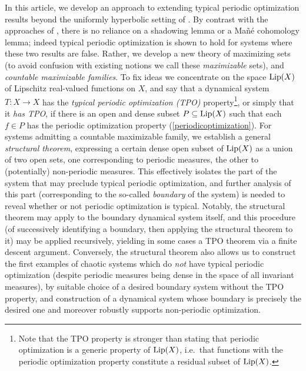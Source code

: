 \documentclass[reqno,11pt]{amsart}
\theoremstyle{definition}
\theoremstyle{remark}
\theoremstyle{remark}
\def\lip{{\rm Lip}}
\numberwithin{equation}{section}
\begin{document}
In this article, we develop an approach to extending typical periodic optimization results beyond the uniformly hyperbolic setting of \cite{C02, HLMXZ19}. By contrast with the approaches of  \cite{C02, HLMXZ19,LZ24},
there is no reliance on a shadowing lemma or a Ma\~n\'e cohomology lemma; indeed typical periodic optimization is shown to hold for systems where these two results are false.
Rather, we develop a new theory of maximizing sets (to avoid confusion with existing notions we call these \emph{maximizable} sets), and \emph{countable maximizable families}.
To fix ideas we concentrate on the space $\lip(X)$ of Lipschitz real-valued functions on $X$,
and say that a dynamical system $T:X\to X$
has the \emph{typical periodic optimization (TPO)} property\footnote{Note that the TPO property is stronger than stating that periodic optimization is a generic property of $\lip(X)$, i.e.~that
functions with the periodic optimization property constitute a residual subset of $\lip(X)$.},
or simply that it \emph{has TPO},
if
there is an open and dense subset $P\subseteq \lip(X)$ such that each $f\in P$ has the periodic optimization property (\ref{periodicoptimization}).
For systems admitting a countable maximizable family, we establish a general \emph{structural theorem},
expressing a certain dense open subset of $\lip(X)$ as a union of two open sets,
one corresponding to periodic measures, the other to (potentially) non-periodic measures.
This effectively isolates the part of the system that may preclude typical periodic optimization,
and further analysis of this part (corresponding to the so-called \emph{boundary} of the system) is needed to reveal whether or not periodic optimization is typical.
Notably, the structural theorem may apply to the boundary dynamical system itself, and this procedure (of successively identifying a boundary, then applying the structural theorem to it) may be applied recursively, yielding in some cases a TPO theorem via a finite descent argument.  Conversely, the structural theorem also allows us to construct the first examples of chaotic systems which do \emph{not} have typical periodic optimization (despite periodic measures being dense in the space of all invariant measures), by suitable choice of a desired boundary system without the TPO property, and construction of a dynamical system whose boundary is 
precisely the desired one and moreover robustly supports non-periodic optimization.
\end{document}
